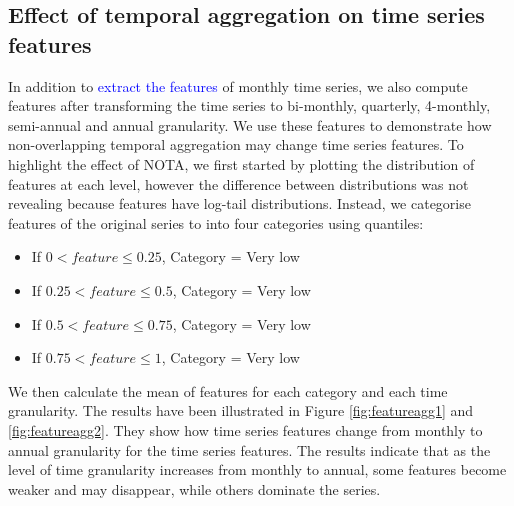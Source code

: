 \documentclass[preprint, 3p,
authoryear]{elsarticle} %
\providecommand{\tightlist}{%
  \setlength{\itemsep}{0pt}\setlength{\parskip}{0pt}}
\begin{document}
\hypertarget{taeffect}{%
\subsection{Effect of temporal aggregation on time series
features}\label{taeffect}}

In addition to \textcolor{blue}{extract the features} of monthly time
series, we also compute features after transforming the time series to
bi-monthly, quarterly, 4-monthly, semi-annual and annual granularity. We
use these features to demonstrate how non-overlapping temporal
aggregation may change time series features. To highlight the effect of
NOTA, we first started by plotting the distribution of features at each
level, however the difference between distributions was not revealing
because features have log-tail distributions. Instead, we categorise
features of the original series to into four categories using quantiles:

\begin{itemize}
\tightlist
\item
  If \(0 < feature \leqslant 0.25\), Category = Very low
\item
  If \(0.25 < feature \leqslant 0.5\), Category = Very low
\item
  If \(0.5 < feature \leqslant 0.75\), Category = Very low
\item
  If \(0.75 < feature \leqslant 1\), Category = Very low
\end{itemize}

We then calculate the mean of features for each category and each time
granularity. The results have been illustrated in Figure
\ref{fig:featureagg1} and \ref{fig:featureagg2}. They show how time
series features change from monthly to annual granularity for the time
series features. The results indicate that as the level of time
granularity increases from monthly to annual, some features become
weaker and may disappear, while others dominate the series.
\end{document}
